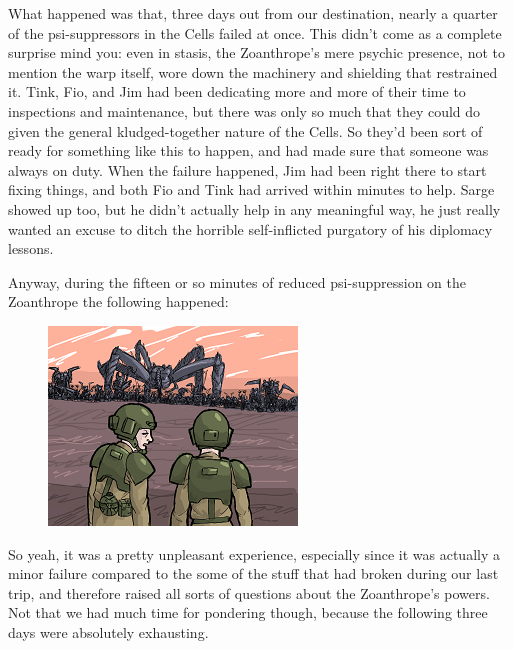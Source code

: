 What happened was that, three days out from our destination, nearly a quarter of the psi-suppressors in the Cells failed at once. 
This didn't come as a complete surprise mind you: 
even in stasis, the Zoanthrope's mere psychic presence, not to mention the warp itself, wore down the machinery and shielding that restrained it. 
Tink, Fio, and Jim had been dedicating more and more of their time to inspections and maintenance, but there was only so much that they could do given the general kludged-together nature of the Cells. 
So they'd been sort of ready for something like this to happen, and had made sure that someone was always on duty. 
When the failure happened, Jim had been right there to start fixing things, and both Fio and Tink had arrived within minutes to help. 
Sarge showed up too, but he didn't actually help in any meaningful way, he just really wanted an excuse to ditch the horrible self-inflicted purgatory of his diplomacy lessons.

Anyway, during the fifteen or so minutes of reduced psi-suppression on the Zoanthrope the following happened: 








\begin{figure}
	\begin{center}
		\includegraphics[width=\figwidth]{pics/15/18.png}
	\end{center}
\end{figure}
So yeah, it was a pretty unpleasant experience, especially since it was actually a minor failure compared to the some of the stuff that had broken during our last trip, and therefore raised all sorts of questions about the Zoanthrope's powers. 
Not that we had much time for pondering though, because the following three days were absolutely exhausting.

